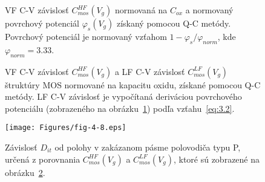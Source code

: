 \newpage
\begin{figure}[h!]\centering
  \begin{minipage}[c]{\myfiguresize}
    \begin{center}
      
      \caption[VF C-V závislosť $C_{mos}^{HF}(V_{g})$ a priebeh
        povrchového potenciálu $\varphi_{s}(V_{g})$ štruktúry MOS
        získané pomocou Q-C metódy]{VF C-V závislosť
        $C_{mos}^{HF}(V_{g})$ normovaná na $C_{ox}$ a normovaný
        povrchový potenciál $\varphi_{s}(V_{g})$ získaný pomocou Q-C
        metódy. Povrchový potenciál je normovaný vzťahom
        $1-{\varphi_{s}}/{\varphi_{norm}}$, kde
        $\varphi_{norm}=3.33$.}\label{fig:4.6}
    \end{center}
  \end{minipage}
\end{figure}

\begin{figure}[h!]\centering
  \begin{minipage}[c]{\myfiguresize}
    \begin{center}
      
      \caption[VF C-V závislosť $C_{mos}^{HF}(V_{g})$ a LF C-V
        závislosť $C_{mos}^{LF}(V_{g})$ štruktúry MOS normované na
        kapacitu oxidu, získané pomocou Q-C metódy]{VF C-V závislosť
        $C_{mos}^{HF}(V_{g})$ a LF C-V závislosť $C_{mos}^{LF}(V_{g})$
        štruktúry MOS normované na kapacitu oxidu, získané pomocou Q-C
        metódy.  LF C-V závislosť je vypočítaná deriváciou povrchového
        potenciálu (zobrazeného na obrázku~\ref{fig:4.6}) podľa
        vzťahu~\ref{eq:3.2}.}\label{fig:4.7}
    \end{center}
  \end{minipage}
\end{figure}

\newpage
\begin{figure}[h!]\centering
  \begin{minipage}[c]{\myfiguresize}
    \begin{center}
      \texttt{[image: Figures/fig-4-8.eps]}
      \caption[Závislosť $D_{it}$ od polohy v zakázanom pásme
        polovodiča typu P, určená z porovnania $C_{mos}^{HF}(V_{g})$ a
        $C_{mos}^{LF}(V_{g})$]{Závislosť $D_{it}$ od polohy v
        zakázanom pásme polovodiča typu P, určená z porovnania
        $C_{mos}^{HF}(V_{g})$ a $C_{mos}^{LF}(V_{g})$, ktoré sú
        zobrazené na obrázku~\ref{fig:4.7}.}\label{fig:4.8}
    \end{center}
  \end{minipage}
\end{figure}

